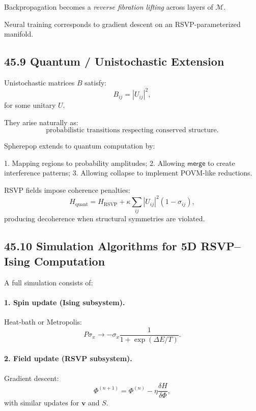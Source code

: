 \documentclass[12pt,letterpaper]{article}
\theoremstyle{remark}
\begin{document}
Backpropagation becomes 
a \emph{reverse fibration lifting} across layers of $\mathcal{M}$.

Neural training corresponds to  
gradient descent on an RSVP-parameterized manifold.

\subsection{45.9 Quantum / Unistochastic Extension}

Unistochastic matrices $B$ satisfy:
\[
B_{ij} = |U_{ij}|^2,
\]
for some unitary $U$.

They arise naturally as:
\[
\text{probabilistic transitions respecting conserved structure}.
\]

Spherepop extends to quantum computation by:

1. Mapping regions to probability amplitudes;  
2. Allowing $\mathsf{merge}$ to create interference patterns;  
3. Allowing collapse to implement POVM-like reductions.

RSVP fields impose coherence penalties:
\[
H_{\text{quant}} 
= H_{\text{RSVP}}
+ \kappa \sum_{ij} |U_{ij}|^2 (1 - \sigma_{ij}),
\]
producing decoherence when structural symmetries are violated.

\subsection{45.10 Simulation Algorithms for 5D RSVP–Ising Computation}

A full simulation consists of:

\paragraph{1. Spin update (Ising subsystem).}
Heat-bath or Metropolis:
\[
P\sigma_x \to -\sigma_x 
\frac{1}{1 + \exp(\Delta E / T)}.
\]

\paragraph{2. Field update (RSVP subsystem).}
Gradient descent:
\[
\Phi^{(n+1)} = \Phi^{(n)} - \eta \frac{\delta H}{\delta \Phi},
\]
with similar updates for $\mathbf{v}$ and $S$.
\end{document}
